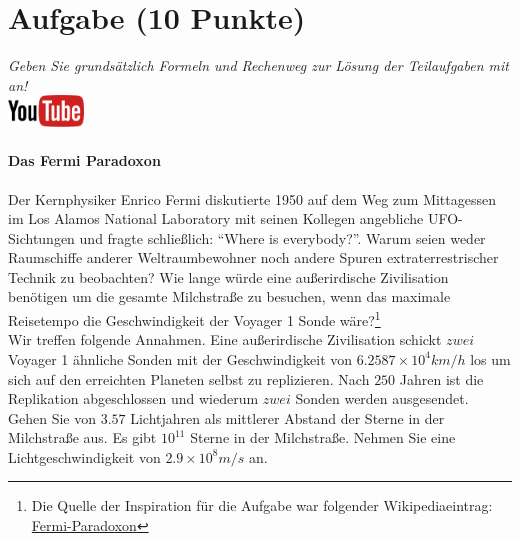 \documentclass[a4paper, 9pt]{scrartcl}\usepackage[]{graphicx}\usepackage[]{xcolor}
\begin{document}
 
\clearpage

\section{Aufgabe \hfill (10 Punkte)}

\textit{Geben Sie grunds{\"a}tzlich Formeln und Rechenweg zur L{\"o}sung der
  Teilaufgaben mit an!} \\[1Ex]

\hfill\href{https://youtu.be/iCQogS6KhPM}{\includegraphics[width =
  2cm]{img/youtube}} %
\hspace{2Ex}

\paragraph{Das Fermi Paradoxon}



Der Kernphysiker Enrico Fermi diskutierte 1950 auf dem Weg zum Mittagessen
im Los Alamos National Laboratory mit seinen Kollegen angebliche
UFO-Sichtungen und fragte schlie{\ss}lich: "`Where is everybody?"'. Warum seien
weder Raumschiffe anderer Weltraumbewohner noch andere Spuren
extraterrestrischer Technik zu beobachten? Wie lange w{\"u}rde eine au{\ss}erirdische
Zivilisation ben{\"o}tigen um die gesamte Milchstra{\ss}e zu
besuchen, wenn das maximale Reisetempo die Geschwindigkeit der Voyager 1 Sonde w{\"a}re?\footnote{Die Quelle der Inspiration
  für die Aufgabe war folgender Wikipediaeintrag:
  \href{https://de.wikipedia.org/wiki/Fermi-Paradoxon}{Fermi-Paradoxon}}\\[-1ex]

Wir treffen folgende Annahmen. Eine au{\ss}erirdische Zivilisation schickt $zwei$
Voyager 1 {\"a}hnliche Sonden mit der Geschwindigkeit von $\ensuremath{6.2587\times 10^{4}}km/h$
los um sich auf den erreichten Planeten selbst zu replizieren. Nach
$250$ Jahren ist die Replikation abgeschlossen und wiederum
$zwei$ Sonden werden ausgesendet. Gehen Sie von
$3.57$ Lichtjahren als mittlerer Abstand der Sterne in der
Milchstra{\ss}e aus. Es gibt $\ensuremath{10^{11}}$ Sterne in der Milchstra{\ss}e. Nehmen
Sie eine Lichtgeschwindigkeit von $\ensuremath{2.9\times 10^{8}}m/s$ an.
\end{document}
